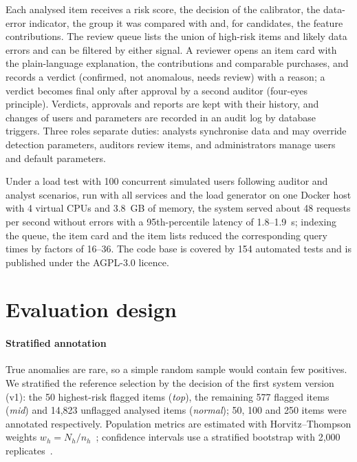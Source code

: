 \documentclass[conference]{IEEEtran}
\begin{document}
Each analysed item receives a risk score, the decision of the calibrator, the data-error indicator, the
group it was compared with and, for candidates, the feature contributions. The review queue lists the
union of high-risk items and likely data errors and can be filtered by either signal. A reviewer opens
an item card with the plain-language explanation, the contributions and comparable purchases, and
records a verdict (confirmed, not anomalous, needs review) with a reason; a verdict becomes final only
after approval by a second auditor (four-eyes principle). Verdicts, approvals and reports are kept with
their history, and changes of users and parameters are recorded in an audit log by database triggers.
Three roles separate duties: analysts synchronise data and may override detection parameters,
auditors review items, and administrators manage users and default parameters.

Under a load test with 100 concurrent simulated users following auditor and analyst scenarios, run with
all services and the load generator on one Docker host with 4 virtual CPUs and 3.8~GB of memory, the
system served about 48 requests per second without errors with a 95th-percentile latency of
1.8--1.9~s; indexing the queue, the item card and the item lists reduced the corresponding query times by
factors of 16--36. The code base is covered by 154 automated tests and is published under the AGPL-3.0
licence.

\section{Evaluation design}\label{sec:eval}

\paragraph{Stratified annotation} True anomalies are rare, so a simple random sample would contain few
positives. We stratified the reference selection by the decision of the first system version (v1): the 50
highest-risk flagged items (\emph{top}), the remaining 577 flagged items (\emph{mid}) and 14{,}823 unflagged
analysed items (\emph{normal}); 50, 100 and 250 items were annotated respectively. Population metrics are
estimated with Horvitz--Thompson weights $w_h=N_h/n_h$~\cite{horvitz1952sampling}; confidence intervals use a
stratified bootstrap with 2{,}000 replicates~\cite{efron1993bootstrap}.
\end{document}
